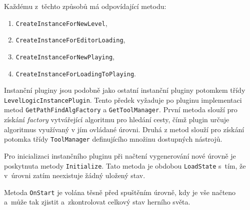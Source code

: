 Každému z~těchto způsobů má odpovídající metodu:
\begin{enumerate}
	\item \texttt{CreateInstanceForNewLevel},
	\item \texttt{CreateInstanceForEditorLoading},
	\item \texttt{CreateInstanceForNewPlaying},
	\item \texttt{CreateInstanceForLoadingToPlaying}.
\end{enumerate}

Instanční pluginy jsou podobně jako ostatní instanční pluginy potomkem třídy \texttt{LevelLogicInstancePlugin}. Tento předek vyžaduje po pluginu implementaci metod \texttt{GetPathFindAlgFactory} a \texttt{GetToolManager}. První metoda slouží pro získání \textit{factory} vytvářející algoritmu pro hledání cesty, čímž plugin určuje algoritmus využívaný v jím ovládané úrovni. Druhá z metod slouží pro získání potomka třídy \texttt{ToolManager} definujícího množinu dostupných nástrojů. 

Pro inicializaci instančního pluginu při načtení vygenerování nové úrovně je poskytnuta metody \texttt{Initialize}. Tato metoda je obdobou \texttt{LoadState} s~tím, že v~úrovni zatím neexistuje žádný uložený stav.

Metoda \texttt{OnStart} je volána těsně před spuštěním úrovně, kdy je vše načteno a~může tak zjistit a~zkontrolovat celkový stav herního světa.



